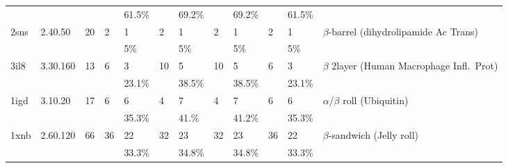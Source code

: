 \begin{sidewaystable}
\begin{center}
\begin{tabular}{llllllllllll}
      &               &       &       & 61.5\%&       & 69.2\%&       & 69.2\%&       & 61.5\%&                                         \\
2sns  & 2.40.50       & 20    & 2     & 1     & 2     & 1     & 2     & 1     & 2     & 1     & $\beta$-barrel (dihydrolipamide Ac Trans)\\
      &               &       &       & 5\%   &       & 5\%   &       & 5\%   &       & 5\%   &                                         \\
3il8  & 3.30.160      & 13    & 6     & 3     & 10    & 5     & 10    & 5     & 6     & 3     & $\beta$ 2layer (Human Macrophage Infl.\ Prot)   \\
      &               &       &       & 23.1\%&       & 38.5\%&       & 38.5\%&       & 23.1\%&                                         \\
1igd  & 3.10.20       & 17    & 6     & 6     & 4     & 7     & 4     & 7     & 6     & 6     & $\alpha$/$\beta$ roll (Ubiquitin)       \\
      &               &       &       & 35.3\%&       & 41.\% &       & 41.2\%&       & 35.3\%&                                         \\
1xnb  & 2.60.120      & 66    & 36    & 22    & 32    & 23    & 32    & 23    & 36    & 22    & $\beta$-sandwich (Jelly roll)           \\
      &               &       &       & 33.3\%&       & 34.8\%&       & 34.8\%&       & 33.3\%&                                         \\ \hline
\end{tabular}
\end{center}
\end{sidewaystable}

